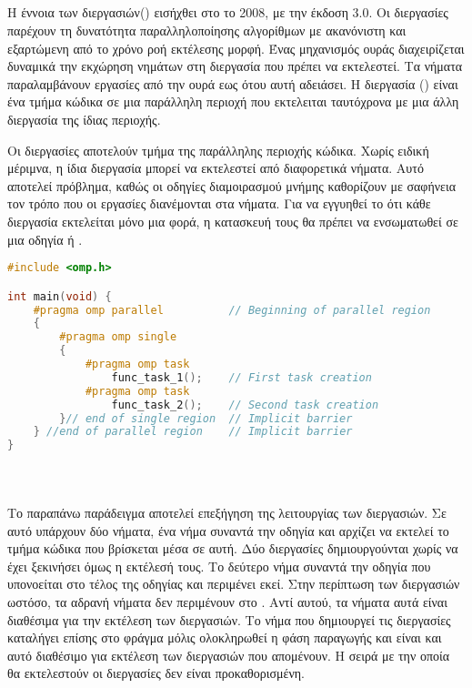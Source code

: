 \subsection{}
\subparagraph{}
Η έννοια των διεργασιών(\emph{}) εισήχθει στο  το 2008, με την έκδοση 3.0\cite{parallel_dist}.
Οι διεργασίες παρέχουν τη δυνατότητα παραλληλοποίησης αλγορίθμων με ακανόνιστη και εξαρτώμενη από το χρόνο ροή εκτέλεσης μορφή. Ένας μηχανισμός ουράς διαχειρίζεται δυναμικά την εκχώρηση νημάτων στη διεργασία που πρέπει να εκτελεστεί. Τα νήματα παραλαμβάνουν εργασίες από την ουρά εως ότου αυτή αδειάσει.
Η διεργασία (\emph{}) είναι ένα τμήμα κώδικα σε μια παράλληλη περιοχή που εκτελειται ταυτόχρονα με μια άλλη διεργασία της ίδιας περιοχής. 

Οι διεργασίες αποτελούν τμήμα της παράλληλης περιοχής κώδικα.
Χωρίς ειδική μέριμνα, η ίδια διεργασία μπορεί να εκτελεστεί από διαφορετικά νήματα. Αυτό αποτελεί πρόβλημα, καθώς οι οδηγίες διαμοιρασμού μνήμης καθορίζουν με σαφήνεια τον τρόπο που οι εργασίες διανέμονται στα νήματα. Για να εγγυηθεί το \emph{} ότι κάθε διεργασία εκτελείται μόνο μια φορά, η κατασκευή τους θα πρέπει να ενσωματωθεί σε μια οδηγία \emph{} ή \emph{}.
\ \\

		\begin{lstlisting}[tabsize=4, basicstyle=\small, language=C++, caption={\el{Παράδειγμα κώδικα με διεργασίες}}, frame=tb]
#include <omp.h>

int main(void) {	
	#pragma omp parallel          // Beginning of parallel region
	{
		#pragma omp single
		{
			#pragma omp task
				func_task_1();    // First task creation
			#pragma omp task
				func_task_2();    // Second task creation
		}// end of single region  // Implicit barrier
	} //end of parallel region    // Implicit barrier
}
\end{lstlisting}

\ \\
\subparagraph{}
Το παραπάνω παράδειγμα αποτελεί επεξήγηση της λειτουργίας των διεργασιών. Σε αυτό υπάρχουν δύο νήματα, ένα νήμα συναντά την οδηγία \emph{} και αρχίζει να εκτελεί το τμήμα κώδικα που βρίσκεται μέσα σε αυτή. Δύο διεργασίες δημιουργούνται χωρίς να έχει ξεκινήσει όμως η εκτέλεσή τους. Tο δεύτερο νήμα συναντά την οδηγία \emph{} που υπονοείται στο τέλος της οδηγίας \emph{} και περιμένει εκεί. Στην περίπτωση των διεργασιών ωστόσο, τα αδρανή νήματα δεν περιμένουν στο \emph{}. Αντί αυτού, τα νήματα αυτά είναι διαθέσιμα για την εκτέλεση των διεργασιών. Το νήμα που δημιουργεί τις διεργασίες καταλήγει επίσης στο φράγμα μόλις ολοκληρωθεί η φάση παραγωγής και είναι και αυτό διαθέσιμο για εκτέλεση των διεργασιών που απομένουν. Η σειρά με την οποία θα εκτελεστούν οι διεργασίες δεν είναι προκαθορισμένη.
\clearpage
